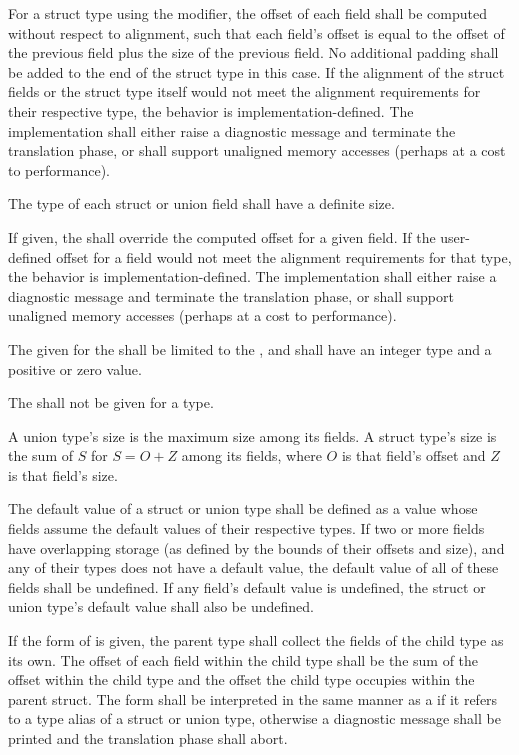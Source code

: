 \specsubsubitem
For a struct type using the  modifier, the offset of each
field shall be computed without respect to alignment, such that each field's
offset is equal to the offset of the previous field plus the size of the
previous field. No additional padding shall be added to the end of the struct
type in this case. If the alignment of the struct fields or the struct type
itself would not meet the alignment requirements for their respective type, the
behavior is implementation-defined. The implementation shall either raise a
diagnostic message and terminate the translation phase, or shall support
unaligned memory accesses (perhaps at a cost to performance).

\specsubsubitem
The type of each struct or union field shall have a definite size.

\specsubsubitem
If given, the  shall override the computed offset
for a given field. If the user-defined offset for a field would not meet the
alignment requirements for that type, the behavior is implementation-defined.
The implementation shall either raise a diagnostic message and terminate the
translation phase, or shall support unaligned memory accesses (perhaps at a
cost to performance).

\specsubsubitem
The  given for the  shall
be limited to the , and
shall have an integer type and a positive or zero value.

\specsubsubitem
The  shall not be given for a 
type.

\specsubsubitem
A union type's size is the maximum size among its fields. A struct type's size
is the sum of $S$ for $S = O+Z$ among its fields, where $O$ is that
field's offset and $Z$ is that field's size.

\specsubsubitem
The default value of a struct or union type shall be defined as a value whose
fields assume the default values of their respective types. If two or more
fields have overlapping storage (as defined by the bounds of their offsets and
size), and any of their types does not have a default value, the default value
of all of these fields shall be undefined. If any field's default value is
undefined, the struct or union type's default value shall also be undefined.

\specsubsubitem
If the  form of 
is given, the parent type shall collect the fields of the child type as its
own. The offset of each field within the child type shall be the sum of the
offset within the child type and the offset the child type occupies within the
parent struct. The  form shall be interpreted in the same
manner as a  if it refers to a type alias of a
struct or union type, otherwise a diagnostic message shall be printed and the
translation phase shall abort.

